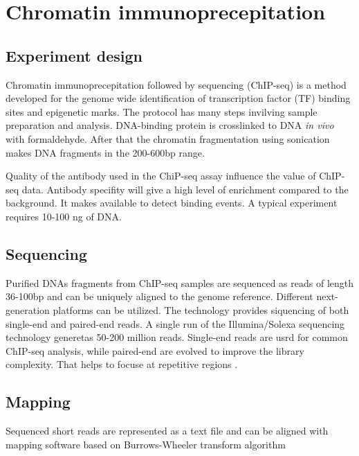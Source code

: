 \chapter{Chromatin immunoprecepitation}
\section{Experiment design}
Chromatin immunoprecepitation followed by sequencing (ChIP-seq) is a method developed for the genome wide identification of transcription factor (TF) binding sites and epigenetic marks.
The protocol has many steps invilving sample preparation and analysis.
DNA-binding protein is crosslinked to DNA \emph{in vivo} with formaldehyde.
After that the chromatin fragmentation using sonication makes DNA fragments in the 200-600bp range.

Quality of the antibody used in the ChiP-seq assay influence the value of ChIP-seq data.
Antibody specifity will give a high level of enrichment compared to the background. 
It makes available to detect binding events.
A typical experiment requires 10-100 ng of DNA.


\section{Sequencing}
Purified DNAs fragments from ChIP-seq samples are sequenced as reads of length 36-100bp and can be uniquely aligned to the genome reference.
Different next-generation platforms can be utilized.
The technology provides siquencing of both single-end and paired-end reads.
A single run of the Illumina/Solexa sequencing technology generetas 50-200 million reads\cite{park2009chip}.
Single-end reads are usrd for common ChIP-seq analysis, while paired-end are evolved to improve the library complexity.
That helps to focuse at repetitive regions \cite{chen2012systematic}.

\section{Mapping}
Sequenced short reads are represented as a text file and can be aligned with mapping software based on Burrows-Wheeler transform algorithm \cite{li2009fast} \cite{siren2014indexing}
